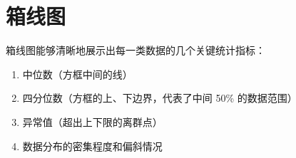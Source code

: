\section{箱线图}

箱线图能够清晰地展示出每一类数据的几个关键统计指标：

\begin{enumerate}
    \item 中位数（方框中间的线）
    \item 四分位数（方框的上、下边界，代表了中间 50\% 的数据范围）
    \item 异常值（超出上下限的离群点）
    \item 数据分布的密集程度和偏斜情况
\end{enumerate}

